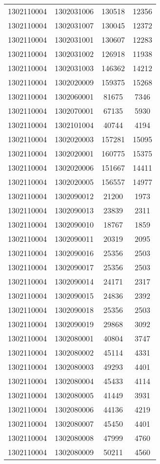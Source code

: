 \begin{longtable}{llcc}
1302110004 & 1302031006 & 130518 & 12356\\
1302110004 & 1302031007 & 130045 & 12372\\
1302110004 & 1302031001 & 130607 & 12283\\
1302110004 & 1302031002 & 126918 & 11938\\
1302110004 & 1302031003 & 146362 & 14212\\
1302110004 & 1302020009 & 159375 & 15268\\
1302110004 & 1302060001 & 81675 & 7346\\
1302110004 & 1302070001 & 67135 & 5930\\
1302110004 & 1302101004 & 40744 & 4194\\
1302110004 & 1302020003 & 157281 & 15095\\
1302110004 & 1302020001 & 160775 & 15375\\
1302110004 & 1302020006 & 151667 & 14411\\
1302110004 & 1302020005 & 156557 & 14977\\
1302110004 & 1302090012 & 21200 & 1973\\
1302110004 & 1302090013 & 23839 & 2311\\
1302110004 & 1302090010 & 18767 & 1859\\
1302110004 & 1302090011 & 20319 & 2095\\
1302110004 & 1302090016 & 25356 & 2503\\
1302110004 & 1302090017 & 25356 & 2503\\
1302110004 & 1302090014 & 24171 & 2317\\
1302110004 & 1302090015 & 24836 & 2392\\
1302110004 & 1302090018 & 25356 & 2503\\
1302110004 & 1302090019 & 29868 & 3092\\
1302110004 & 1302080001 & 40804 & 3747\\
1302110004 & 1302080002 & 45114 & 4331\\
1302110004 & 1302080003 & 49293 & 4401\\
1302110004 & 1302080004 & 45433 & 4114\\
1302110004 & 1302080005 & 41449 & 3931\\
1302110004 & 1302080006 & 44136 & 4219\\
1302110004 & 1302080007 & 45450 & 4401\\
1302110004 & 1302080008 & 47999 & 4760\\
1302110004 & 1302080009 & 50211 & 4560\\

\end{longtable}
